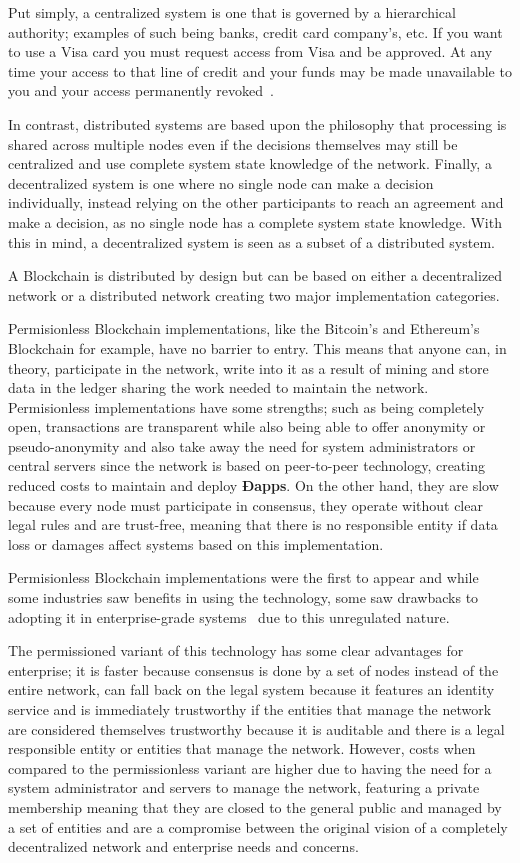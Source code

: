 Put simply, a centralized system is one that is governed by a hierarchical
authority; examples of such being banks, credit card company’s, etc. If you
want to use a Visa card you must request access from Visa and be approved. At
any time your access to that line of credit and your funds may be made
unavailable to you and your access permanently revoked~\cite{Dreifuerst2018}.

In contrast, distributed systems are based upon the philosophy that processing
is shared across multiple nodes even if the decisions themselves may still be
centralized and use complete system state knowledge of the network. Finally, a
decentralized system is one where no single node can make a decision
individually, instead relying on the other participants to reach an agreement
and make a decision, as no single node has a complete system state knowledge.
With this in mind, a decentralized system is seen as a subset of a distributed
system.

A Blockchain is distributed by design but can be based on either a
decentralized network or a distributed network creating two major
implementation categories.

Permisionless Blockchain implementations, like the Bitcoin's and Ethereum's
Blockchain for example, have no barrier to entry. This means that anyone can,
in theory, participate in the network, write into it as a result of mining and
store data in the ledger sharing the work needed to maintain the network.
Permisionless implementations have some strengths; such as being completely
open, transactions are transparent while also being able to offer anonymity or
pseudo-anonymity and also take away the need for system administrators or
central servers since the network is based on peer-to-peer technology, creating
reduced costs to maintain and deploy \textbf{Ðapps}. On the other hand, they
are slow because every node must participate in consensus, they operate without
clear legal rules and are trust-free, meaning that there is no responsible
entity if data loss or damages affect systems based on this implementation.

Permisionless Blockchain implementations were the first to appear and while
some industries saw benefits in using the technology, some saw drawbacks to
adopting it in enterprise-grade systems~\cite{Gopinath2016} due to this
unregulated nature.

The permissioned variant of this technology has some clear advantages for
enterprise; it is faster because consensus is done by a set of nodes instead of
the entire network, can fall back on the legal system because it features an
identity service and is immediately trustworthy if the entities that manage the
network are considered themselves trustworthy because it is auditable and there
is a legal responsible entity or entities that manage the network. However,
costs when compared to the permissionless variant are higher due to having the
need for a system administrator and servers to manage the network, featuring a
private membership meaning that they are closed to the general public and
managed by a set of entities and are a compromise between the original vision
of a completely decentralized network and enterprise needs and concerns. 

